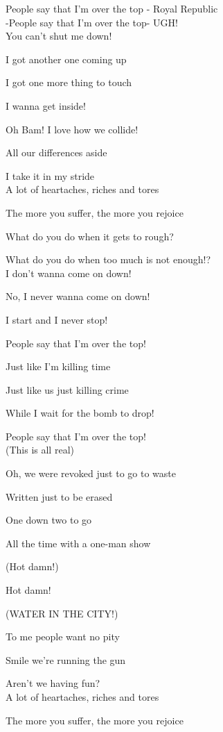 \documentclass{article}
\begin{document}
People say that I'm over the top - Royal Republic\\

-People say that I'm over the top-
UGH!\\

You can't shut me down!

I got another one coming up

I got one more thing to touch

I wanna get inside!

Oh Bam! I love how we collide!

All our differences aside

I take it in my stride\\

A lot of heartaches, riches and tores

The more you suffer, the more you rejoice

What do you do when it gets to rough?

What do you do when too much is not enough!?\\

I don't wanna come on down!

No, I never wanna come on down!

I start and I never stop!

People say that I'm over the top!

Just like I'm killing time

Just like us just killing crime

While I wait for the bomb to drop!

People say that I'm over the top!\\

(This is all real)

Oh, we were revoked just to go to waste

Written just to be erased

One down two to go

All the time with a one-man show

(Hot damn!)

Hot damn!

(WATER IN THE CITY!)

To me people want no pity

Smile we're running the gun

Aren't we having fun?\\

A lot of heartaches, riches and tores

The more you suffer, the more you rejoice
\end{document}
